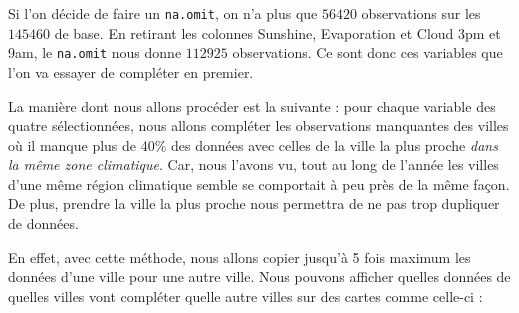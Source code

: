 \documentclass{article}
\begin{document}
Si l'on décide de faire un \texttt{na.omit}, on n'a plus que $56420$ observations sur les $145460$ de base. En retirant les colonnes Sunshine, Evaporation et Cloud 3pm et 9am, le \texttt{na.omit} nous donne $112925$ observations. Ce sont donc ces variables que l'on va essayer de compléter en premier.

La manière dont nous allons procéder est la suivante : pour chaque variable des quatre sélectionnées, nous allons compléter les observations manquantes des villes où il manque plus de 40\% des données avec celles de la ville la plus proche \emph{dans la même zone climatique}. Car, nous l'avons vu, tout au long de l'année les villes d'une même région climatique semble se comportait à peu près de la même façon. De plus, prendre la ville la plus proche nous permettra de ne pas trop dupliquer de données. 

En effet, avec cette méthode, nous allons copier jusqu'à 5 fois maximum les données d'une ville pour une autre ville. Nous pouvons afficher quelles données de quelles villes vont compléter quelle autre villes sur des cartes comme celle-ci :
\end{document}

